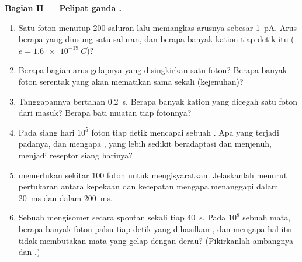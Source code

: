 \begin{problem}
\medskip
\noindent\textbf{Bagian II --- Pelipat ganda .}
\begin{enumerate}[resume]
  \item Satu foton menutup $200$ saluran lalu memangkas arusnya sebesar
        \qty{1}{pA}. Arus berapa yang diusung satu saluran, dan berapa banyak
        kation tiap detik itu ($e = \qty{1.6e-19}{C}$)?
  \item Berapa bagian arus gelapnya yang disingkirkan satu foton? Berapa
        banyak foton serentak yang akan mematikan  sama sekali
        (kejenuhan)?
  \item Tanggapannya bertahan \qty{0.2}{s}. Berapa banyak kation yang dicegah
        satu foton dari masuk? Berapa bati muatan tiap
        fotonnya?
  \item Pada siang hari $10^{5}$ foton tiap detik mencapai sebuah . Apa yang terjadi
        padanya, dan mengapa , yang lebih sedikit beradaptasi dan menjenuh, menjadi
        reseptor siang harinya?
  \item {} memerlukan sekitar $100$ foton untuk mengisyaratkan. Jelaskanlah menurut
        pertukaran antara kepekaan dan kecepatan mengapa  menanggapi dalam
        \qty{20}{ms} dan  dalam \qty{200}{ms}.
  \item Sebuah  mengisomer secara spontan sekali tiap \qty{40}{s}. Pada
        $10^{8}$  sebuah mata, berapa banyak foton palsu tiap detik
        yang dihasilkan , dan mengapa hal itu tidak membutakan mata yang
        gelap dengan derau? (Pikirkanlah ambangnya dan .)
\end{enumerate}


\end{problem}
